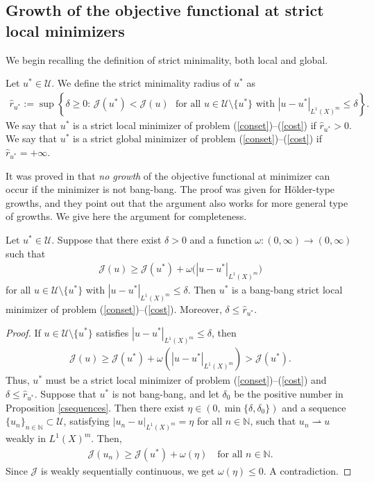 \documentclass[hidelinks,onefignum,onetabnum]{siamart220329}
\begin{document}
\subsection{Growth of the objective functional at strict local minimizers}\label{dospt}

We begin recalling the definition of strict minimality, both local and global.
\begin{definition}
	Let $u^*\in\mathcal U$. We define the  strict minimality radius of $u^*$ as
	\begin{align*}
		\hat r_{u^*}:=\sup\left\lbrace \delta\ge0:\,\mathcal J(u^*)<\mathcal J(u)\,\,\,\, \text{for all $u\in\mathcal U\setminus\{u^*\}$ with $|u-u^*|_{{L^1(X)^m}}\le\delta$}  \right\rbrace.
	\end{align*}
	We say that $u^*$ is a strict local minimizer of problem (\ref{conset})--(\ref{cost}) if $\hat r_{u^*}>0$. We say that $u^*$ is a strict global minimizer of problem (\ref{conset})--(\ref{cost}) if $\hat r_{u^*}=+\infty$.
\end{definition}

It was proved in \cite[Section 2.1]{Casasbang} that
\emph{no growth} of the objective functional at minimizer can occur if the minimizer is not bang-bang. The proof was given for H\"older-type growths, and they point out that the argument also works for more general type of growths. We give here the argument for completeness.

\begin{proposition}
	Let $u^*\in\mathcal U$. Suppose that there exist   $\delta>0$ and a function $\omega:(0,\infty)\to(0,\infty)$ such that 
	\begin{align*}
		\mathcal J(u)\ge \mathcal J(u^*)+\omega\big(|u-u^*|_{{L^1(X)^m}}\big)
	\end{align*}
	for all  $u\in\mathcal U\setminus\{u^*\}$ with $|u-u^*|_{{L^1(X)^m}}\le\delta$. Then $u^*$ is  a bang-bang strict local minimizer of problem (\ref{conset})--(\ref{cost}). Moreover,  $\delta\le\hat r_{u^*}$.
\end{proposition}
\begin{proof}
If $u\in\mathcal U\setminus\{u^*\}$ satisfies $|u-u^*|_{{L^1(X)^m}}\le\delta$, then
	\begin{align*}
		\mathcal J(u)\ge \mathcal J(u^*)+\omega(|u-u^*|_{{L^1(X)^m}})>\mathcal J(u^*).
	\end{align*}
	Thus, $u^*$ must be a strict local minimizer of problem (\ref{conset})--(\ref{cost}) and $\delta\le\hat r_{u^*}$.
	Suppose that $u^*$ is not bang-bang, and let $\delta_0$ be the positive number in Proposition \ref{csequences}. Then there exist $\eta\in(0,\min\{\delta,\delta_0\})$  and a sequence $\{u_n\}_{n\in\mathbb N}\subset\mathcal U$, satisfying  $|u_{n}-u|_{{L^1(X)^m}}=\eta$ for all $n\in\mathbb N$, such that $u_n\rightharpoonup u$ weakly in ${L^1(X)^m}$. Then, 
	\begin{align*}
		\mathcal J(u_n)\ge \mathcal J(u^*)+\omega(\eta)\quad\text{for all $n\in\mathbb N$.}
	\end{align*}
	Since $\mathcal J$ is weakly sequentially continuous, we get $\omega(\eta)\le0$. A contradiction.
\end{proof}
\end{document}
